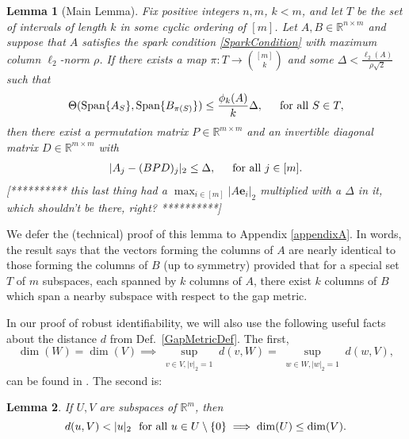 \documentclass[journal, onecolumn]{IEEEtran}
\newtheorem{lemma}{Lemma}
\begin{document}
\begin{lemma}[Main Lemma]\label{MainLemma}
Fix positive integers $n, m$, $k < m$, and let $T$ be the set of intervals of length $k$ in some cyclic ordering of $[m]$. Let $A, B \in \mathbb{R}^{n \times m}$ and suppose that $A$ satisfies the spark condition \eqref{SparkCondition} with maximum column $\ell_2$-norm $\rho$.  If there exists a map $\pi: T \to {[m] \choose k}$ and some $\Delta < \frac{\ell_{2}(A)}{\rho \sqrt{2}}$ such that 
\begin{equation}\label{GapUpperBound}
\Theta(\text{\rm Span}\{A_{S}\}, \text{\rm Span}\{B_{\pi(S)}\}) \leq \frac{ \phi_k(A) }{k} \Delta, \indent \text{for all } S \in T,
\end{equation}
%
then there exist a permutation matrix $P \in \mathbb{R}^{m \times m}$ and an invertible diagonal matrix $D \in \mathbb{R}^{m \times m}$ with
\begin{align}
|A_j - (BPD)_j|_2 \leq \Delta, \indent \text{for all } j \in [m].
\end{align}
[********** this last thing had a $\max_{i \in [m]}|A\mathbf{e}_i|_2$ multiplied with a $\Delta$ in it, which shouldn't be there, right? **********]
\end{lemma}
We defer the (technical) proof of this lemma to Appendix \ref{appendixA}. In words, the result says that the vectors forming the columns of $A$ are nearly identical to those forming the columns of $B$ (up to symmetry) provided that for a special set $T$ of $m$ subspaces, each spanned by $k$ columns of $A$, there exist $k$ columns of $B$ which span a nearby subspace with respect to the gap metric.

In our proof of robust identifiability, we will also use the following useful facts about the distance $d$ from Def.~\ref{GapMetricDef}. The first, 
\begin{equation}\label{SubspaceMetricSameDim}
\dim(W) = \dim(V) \implies \sup_{\substack{v \in V, |v|_2 = 1}}  d(v,W)  = \sup_{\substack{w \in W, |w|_2 = 1}} d(w,V),
\end{equation}
can be found in \cite[Lemma 3.3]{Morris10}. The second is:
\begin{lemma}\label{MinDimLemma}
If $U, V$ are subspaces of $\mathbb{R}^{m}$, then
\begin{equation}\label{MinDim}
d(u,V) < |u|_2 \ \ \text{\rm for all } u \in U \setminus{\{0\}} \implies \dim(U) \leq \dim(V).
\end{equation}
\end{lemma}
\end{document}
